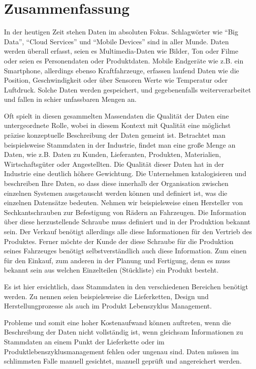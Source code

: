 \chapter*{Zusammenfassung}


In der heutigen Zeit stehen Daten im absoluten Fokus. Schlagwörter wie \enquote{Big Data}, \enquote{Cloud Services} und \enquote{Mobile Devices} sind in aller Munde. Daten werden überall erfasst, seien es Multimedia-Daten wie Bilder, Ton oder Filme oder seien es Personendaten oder Produktdaten. Mobile Endgeräte wie z.B. ein Smartphone, allerdings ebenso Kraftfahrzeuge, erfassen laufend Daten wie die Position, Geschwindigkeit oder über Sensoren Werte wie Temperatur oder Luftdruck. Solche Daten werden gespeichert, und gegebenenfalls weiterverarbeitet und fallen in schier unfassbaren Mengen an. 

Oft spielt in diesen gesammelten Massendaten die Qualität der Daten eine untergeordnete Rolle, wobei in diesem Kontext mit Qualität eine möglichst präzise konzeptuelle Beschreibung der Daten gemeint ist.  
Betrachtet man beispielsweise Stammdaten in der Industrie, findet man eine große Menge an Daten, wie z.B. Daten zu Kunden, Lieferanten, Produkten, Materialien, Wirtschaftsgüter oder Angestellten. Die Qualität dieser Daten hat in der Industrie eine deutlich höhere Gewichtung. Die Unternehmen katalogisieren und beschreiben Ihre Daten, so dass diese innerhalb der Organisation zwischen einzelnen Systemen ausgetauscht werden können und definiert ist, was die einzelnen Datensätze bedeuten. Nehmen wir beispielsweise einen Hersteller von Sechkantschrauben zur Befestigung von Rädern an Fahrzeugen. Die Information über diese herzustellende Schraube muss definiert und in der Produktion bekannt sein. Der Verkauf benötigt allerdings alle diese Informationen für den Vertrieb des Produktes. Ferner möchte der Kunde der diese Schraube für die Produktion seines Fahrzeuges benötigt selbstverständlich auch diese Information. Zum einen für den Einkauf, zum anderen in der Planung und Fertigung, denn es muss bekannt sein aus welchen Einzelteilen (Stückliste) ein Produkt besteht. 

Es ist hier ersichtlich, dass Stammdaten in den verschiedenen Bereichen benötigt werden. Zu nennen seien beispielsweise die Lieferketten, Design und Herstellungprozesse als auch im Produkt Lebenszyklus Management.     

Probleme und somit eine hoher Kostenaufwand können auftreten, wenn die Beschreibung der Daten nicht vollständig ist, wenn gleichsam Informationen zu Stammdaten an einem Punkt der Lieferkette oder im Produktlebenszyklusmanagement fehlen oder ungenau sind. Daten müssen im schlimmsten Falle manuell gesichtet, manuell geprüft und angereichert werden.  

